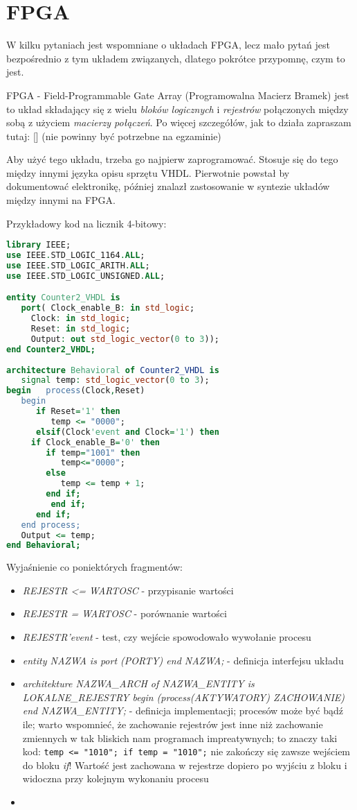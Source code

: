 \section{FPGA}

W kilku pytaniach jest wspomniane o układach FPGA, lecz mało pytań jest bezpośrednio z tym układem związanych, dlatego pokrótce przypomnę, czym to jest.

FPGA - Field-Programmable Gate Array (Programowalna Macierz Bramek) jest to układ składający się z wielu \emph{bloków logicznych} i \emph{rejestrów} połączonych między sobą z użyciem \emph{macierzy połączeń}. Po więcej szczegółów, jak to działa zapraszam tutaj: [\cite{fpga:hiw}] (nie powinny być potrzebne na egzaminie)

Aby użyć tego układu, trzeba go najpierw zaprogramować. Stosuje się do tego między innymi języka opisu sprzętu VHDL. Pierwotnie powstał by dokumentować elektronikę, później znalazł zastosowanie w syntezie układów między innymi na FPGA.

Przykładowy kod na licznik 4-bitowy:

\begin{lstlisting}[language=VHDL]
library IEEE;
use IEEE.STD_LOGIC_1164.ALL;
use IEEE.STD_LOGIC_ARITH.ALL;
use IEEE.STD_LOGIC_UNSIGNED.ALL;

entity Counter2_VHDL is
   port( Clock_enable_B: in std_logic;
 	 Clock: in std_logic;
 	 Reset: in std_logic;
 	 Output: out std_logic_vector(0 to 3));
end Counter2_VHDL;
 
architecture Behavioral of Counter2_VHDL is
   signal temp: std_logic_vector(0 to 3);
begin   process(Clock,Reset)
   begin
      if Reset='1' then
         temp <= "0000";
      elsif(Clock'event and Clock='1') then
 	 if Clock_enable_B='0' then
	    if temp="1001" then
	       temp<="0000";
	    else
	       temp <= temp + 1;
	    end if;
         end if;
      end if;
   end process;
   Output <= temp;
end Behavioral;
\end{lstlisting}

Wyjaśnienie co poniektórych fragmentów:
\begin{itemize}
\item \emph{REJESTR <= WARTOSC} - przypisanie wartości
\item \emph{REJESTR = WARTOSC} - porównanie wartości
\item \emph{REJESTR'event} - test, czy wejście spowodowało wywołanie procesu
\item \emph{entity NAZWA is port (PORTY) end NAZWA;} - definicja interfejsu układu
\item \emph{architekture NAZWA\_ARCH of NAZWA\_ENTITY is LOKALNE\_REJESTRY begin (process(AKTYWATORY) ZACHOWANIE) end NAZWA\_ENTITY;} - definicja implementacji; procesów może być bądź ile; warto wspomnieć, że zachowanie rejestrów jest inne niż zachowanie zmiennych w tak bliskich nam programach impreatywnych; to znaczy taki kod: \lstinline|temp <= "1010"; if temp = "1010";| nie zakończy się zawsze wejściem do bloku \emph{if}! Wartość jest zachowana w rejestrze dopiero po wyjściu z bloku i widoczna przy kolejnym wykonaniu procesu
\item 
\end{itemize}

